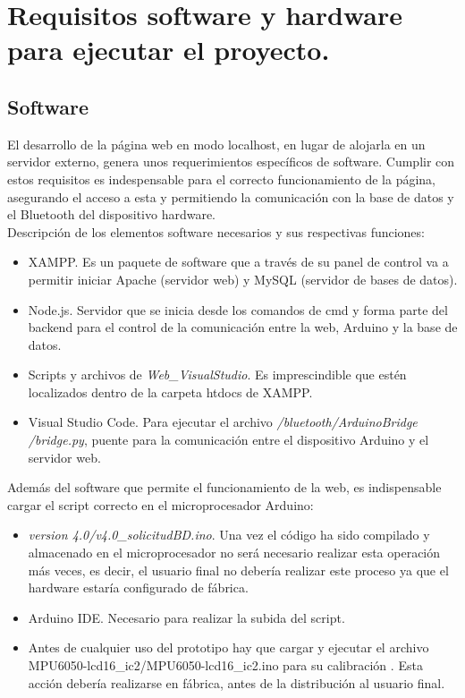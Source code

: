 

\section{Requisitos software y hardware para ejecutar el proyecto.}

\subsection{Software}
El desarrollo de la página web en modo localhost, en lugar de alojarla en un servidor externo, genera unos requerimientos específicos de software. Cumplir con estos requisitos es indespensable para el correcto funcionamiento de la página, asegurando el acceso a esta y permitiendo la comunicación con la base de datos y el Bluetooth del dispositivo hardware.\\

Descripción de los elementos software necesarios y sus respectivas funciones:
\begin{itemize}
    \item XAMPP. Es un paquete de software que a través de su panel de control va a permitir iniciar Apache (servidor web) y MySQL (servidor de bases de datos).
    \item Node.js. Servidor que se inicia desde los comandos de cmd y forma parte del backend para el control de la comunicación entre la web, Arduino y la base de datos.
    \item Scripts y archivos de \textit{Web\_VisualStudio}. Es imprescindible que estén localizados dentro de la carpeta htdocs de XAMPP.
    \item Visual Studio Code. Para ejecutar el archivo \textit{/bluetooth/ArduinoBridge \\ /bridge.py}, puente para la comunicación entre el dispositivo Arduino y el servidor web.
\end{itemize}

Además del software que permite el funcionamiento de la web, es indispensable cargar el script correcto en el microprocesador Arduino:
\begin{itemize}
    \item \textit{version 4.0/v4.0\_solicitudBD.ino}. Una vez el código ha sido compilado y almacenado en el microprocesador no será necesario realizar esta operación más veces, es decir, el usuario final no debería realizar este proceso ya que el hardware estaría configurado de fábrica.
    \item Arduino IDE. Necesario para realizar la subida del script.
    \item Antes de cualquier uso del prototipo hay que cargar y ejecutar el archivo MPU6050-lcd16\_ic2/MPU6050-lcd16\_ic2.ino para su calibración \cite{saragonz91:online}. Esta acción debería realizarse en fábrica, antes de la distribución al usuario final. 
\end{itemize}

